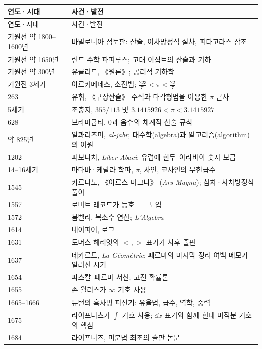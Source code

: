 
\begin{center}
\footnotesize
\renewcommand{\arraystretch}{1.07}
\begin{longtable}{@{}L{0.14\textwidth}L{0.78\textwidth}@{}}
\toprule
연도·시대 & 사건·발전\\
\midrule
\endfirsthead
\toprule 연도·시대 & 사건·발전\\ \midrule \endhead
\bottomrule\endlastfoot
기원전 약 1800--1600년 & 바빌로니아 점토판: 산술, 이차방정식 절차, 피타고라스 삼조\\
기원전 약 1650년 & 린드 수학 파피루스; 고대 이집트의 산술과 기하\\
기원전 약 300년 & 유클리드, 《원론》; 공리적 기하학\\
기원전 3세기 & 아르키메데스, 소진법; $\frac{223}{71}<\pi<\frac{22}{7}$\\
263 & 유휘, 《구장산술》 주석과 다각형법을 이용한 $\pi$ 근사\\
5세기 & 조충지, $355/113$ 및 $3.1415926<\pi<3.1415927$\\
628 & 브라마굽타, 0과 음수의 체계적 산술 규칙\\
약 825년 & 알콰리즈미, \textit{al-jabr}; 대수학(algebra)과 알고리즘(algorithm)의 어원\\
1202 & 피보나치, \textit{Liber Abaci}; 유럽에 힌두--아라비아 숫자 보급\\
14--16세기 & 마다바·케랄라 학파, $\pi$, 사인, 코사인의 무한급수\\
1545 & 카르다노, 《아르스 마그나》 (\textit{Ars Magna}); 삼차·사차방정식 풀이\\
1557 & 로버트 레코드가 등호 $=$ 도입\\
1572 & 봄벨리, 복소수 연산; \textit{L'Algebra}\\
1614 & 네이피어, 로그\\
1631 & 토머스 해리엇의 $<,>$ 표기가 사후 출판\\
1637 & 데카르트, \textit{La Géométrie}; 페르마의 마지막 정리 여백 메모가 알려진 시기\\
1654 & 파스칼--페르마 서신; 고전 확률론\\
1655 & 존 월리스가 $\infty$ 기호 사용\\
1665--1666 & 뉴턴의 흑사병 피신기: 유율법, 급수, 역학, 중력\\
1675 & 라이프니츠가 $\int$ 기호 사용; $\dd x$ 표기와 함께 현대 미적분 기호의 핵심\\
1684 & 라이프니츠, 미분법 최초의 출판 논문\\

\end{longtable}
\end{center}

